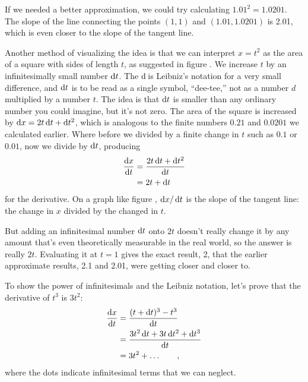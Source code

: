 If we needed a better approximation, we could try calculating $1.01^2=1.0201$. The slope of the
line connecting the points $(1,1)$ and $(1.01,1.0201)$ is 2.01, which is even closer to the slope of the tangent line.

%
%
Another method of visualizing the idea is that we can interpret $x=t^2$ as the area of a square with sides of length $t$,
as suggested in figure . We increase $t$ by an infinitesimally small number $\operatorname{d\!} t$.
The $\operatorname{d\!}$ is Leibniz's notation for a very small difference,
and $\operatorname{d\!} t$ is to be read as a single symbol,
``dee-tee,'' not as a number $d$ multiplied by a number $t$. The idea is that $\operatorname{d\!} t$ is smaller than any ordinary
number you could imagine, but it's not zero. The area of the square is increased by $\operatorname{d\!} x = 2t\operatorname{d\!} t +\operatorname{d\!} t^2$, which is
analogous to the finite numbers $0.21$ and $0.0201$ we calculated earlier. Where before we divided by a finite
change in $t$ such as $0.1$ or $0.01$, now we divide by $\operatorname{d\!} t$, producing
\begin{align*}
  \frac{\operatorname{d\!} x}{\operatorname{d\!} t} &=  \frac{2t\operatorname{d\!} t +\operatorname{d\!} t^2}{\operatorname{d\!} t} \\
                        &= 2t+\operatorname{d\!} t
\end{align*}
for the derivative. On a graph like figure , $\operatorname{d\!} x/\operatorname{d\!} t$ is the slope of the tangent line: the change
in $x$ divided by the changed in $t$.

But adding an infinitesimal number $\operatorname{d\!} t$ onto $2t$ doesn't really change it by any amount that's
even theoretically measurable in the real world, so the answer is really $2t$. Evaluating it at $t=1$ gives the exact result, 2,
that the earlier approximate results, 2.1 and 2.01, were getting closer and closer to.

\begin{eg}\label{eg:third-power}
To show the power of infinitesimals and the Leibniz notation, let's prove that the derivative of $t^3$ is $3t^2$:
\begin{align*}
  \frac{\der x}{\der t} &= \frac{(t+\der t)^3-t^3}{\der t} \\
                        &= \frac{3t^2\der t + 3t\der t^2 + \der t^3}{\der t} \\
                        &= 3t^2 + \ldots \qquad ,
\end{align*}
where the dots indicate infinitesimal terms that we can neglect.
\end{eg}

